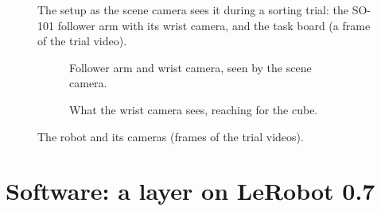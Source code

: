 \begin{figure}[htbp]
  \centering
  \caption{The setup as the scene camera sees it during a sorting trial: the SO-101 follower arm with its wrist camera, and the task board (a frame of the trial video).}
  \label{fig:setup}
\end{figure}

\begin{figure}[htbp]
  \centering
  \begin{subfigure}[t]{0.48\textwidth}
    \centering
    \caption{Follower arm and wrist camera, seen by the scene camera.}
  \end{subfigure}\hfill
  \begin{subfigure}[t]{0.48\textwidth}
    \centering
    \caption{What the wrist camera sees, reaching for the cube.}
  \end{subfigure}
  \caption{The robot and its cameras (frames of the trial videos).}
  \label{fig:robot}
\end{figure}

\section{Software: a layer on LeRobot 0.7}\label{sec:software}


